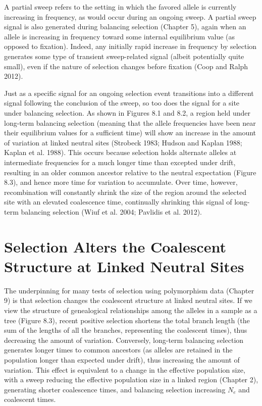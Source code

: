 \documentclass{article}
\begin{document}
A partial sweep refers to the setting in which the favored allele is currently increasing in frequency, as would occur during an ongoing sweep. A partial sweep signal is also generated during balancing selection (Chapter 5), again when an allele is increasing in frequency toward some internal equilibrium value (as opposed to fixation). Indeed, any initially rapid increase in frequency by selection generates some type of transient sweep-related signal (albeit potentially quite small), even if the nature of selection changes before fixation (Coop and Ralph 2012).

Just as a specific signal for an ongoing selection event transitions into a different signal following the conclusion of the sweep, so too does the signal for a site under balancing selection. As shown in Figures 8.1 and 8.2, a region held under long-term balancing selection (meaning that the allele frequencies have been near their equilibrium values for a sufficient time) will show an increase in the amount of variation at linked neutral sites (Strobeck 1983; Hudson and Kaplan 1988; Kaplan et al. 1988). This occurs because selection holds alternate alleles at intermediate frequencies for a much longer time than excepted under drift, resulting in an older common ancestor relative to the neutral expectation (Figure 8.3), and hence more time for variation to accumulate. Over time, however, recombination will constantly shrink the size of the region around the selected site with an elevated coalescence time, continually shrinking this signal of long-term balancing selection (Wiuf et al. 2004; Pavlidis et al. 2012).

\section{Selection Alters the Coalescent Structure at Linked Neutral Sites}
The underpinning for many tests of selection using polymorphism data (Chapter 9) is that selection changes the coalescent structure at linked neutral sites. If we view the structure of genealogical relationships among the alleles in a sample as a tree (Figure 8.3), recent positive selection shortens the total branch length (the sum of the lengths of all the branches, representing the coalescent times), thus decreasing the amount of variation. Conversely, long-term balancing selection generates longer times to common ancestors (as alleles are retained in the population longer than expected under drift), thus increasing the amount of variation. This effect is equivalent to a change in the effective population size, with a sweep reducing the effective population size in a linked region (Chapter 2), generating shorter coalescence times, and balancing selection increasing  $ N_{e} $ and coalescent times.
\end{document}
